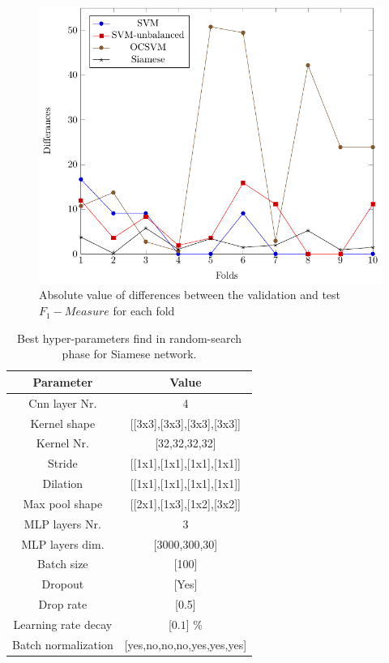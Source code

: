 \begin{figure}[htb]
	\centering
	\includegraphics[width=0.6\linewidth]{img/prai/diff_test_validation/diff_test_validation}
	\caption{Absolute value of differences between the validation and test $ F_1 -Measure$ for each fold}
	\label{fig:diff_test_validation}
\end{figure}
\begin{table}[htb]
	\caption{Best hyper-parameters find in random-search phase for Siamese network\protect\footnotemark[6].}\label{tab:opt_hyperparam}
	\centering
	
	\begin{tabular} {c | c}
		\hline
		\textbf{Parameter} 		& \textbf{Value} \\  
		\hline
		Cnn layer Nr. 	& 4		                          \\
		\hline
		Kernel shape 	& [[3x3],[3x3],[3x3],[3x3]]     \\
		\hline									
		Kernel Nr. 		& [32,32,32,32]	                            \\
		\hline   
		Stride & [[1x1],[1x1],[1x1],[1x1]]			                          \\
		\hline
		Dilation & [[1x1],[1x1],[1x1],[1x1]]  \\
		\hline
		Max pool shape & [[2x1],[1x3],[1x2],[3x2]]     \\
		\hline                   
		MLP layers Nr. 	&	3	                          \\
		\hline
		MLP layers dim.	& [3000,300,30]                        \\
		\hline
		Batch size	&	[100]                                    						\\
		\hline 
		Dropout & [Yes]        \\
		\hline
		Drop rate	&	[0.5]                         \\
		\hline
		Learning rate decay	&	[$0.1$] \% \\
		\hline                
		Batch normalization	&	[yes,no,no,no,yes,yes,yes]                   \\
		\hline
		
	\end{tabular}
\end{table}


